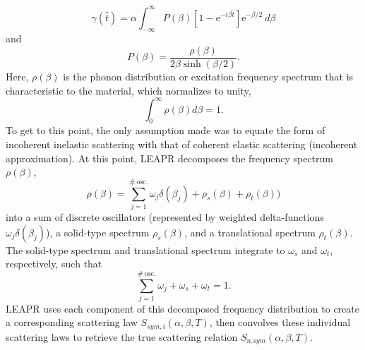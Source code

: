 \documentclass[../master.tex]{subfiles}
\begin{document}
			\begin{equation} 
				\gamma(\hat{t})=\alpha\int_{-\infty}^{\infty}P(\beta)\left[1-\mathrm{e}^{-i\beta\hat{t}}\right]\mathrm{e}^{-\beta/2}~d\beta\label{eq:gamma}
			\end{equation}
			and
			\begin{equation}
				P(\beta)=\frac{\rho(\beta)}{2\beta\sinh(\beta/2)}.
			\end{equation}
			Here, $\rho(\beta)$ is the phonon distribution or excitation frequency spectrum that is characteristic to the material, which normalizes to unity,
			\begin{equation}
				\int_{0}^{\infty}\rho(\beta)d\beta=1.
			\end{equation}
			To get to this point, the only assumption made was to equate the form of incoherent inelastic scattering with that of coherent elastic scattering (incoherent approximation). At this point, LEAPR decomposes the frequency spectrum $\rho(\beta)$,
			\begin{equation}
				\rho(\beta)=\sum_{j=1}^{\#~\mbox{osc.}}\omega_j\delta(\beta_j)+\rho_s(\beta)+\rho_t(\beta))
			\end{equation}
			into a sum of discrete oscillators (represented by weighted delta-functions $\omega_j\delta(\beta_j)$), a solid-type spectrum $\rho_s(\beta)$, and a translational spectrum $\rho_t(\beta)$. The solid-type spectrum and translational spectrum integrate to $\omega_s$ and $\omega_t$, respectively, such that 
			\begin{equation}
                          \sum_{j=1}^{\#~\mbox{osc.}}\omega_j + \omega_s + \omega_t = 1.\label{eq:weightsSumTo1}
			\end{equation}
			LEAPR uses each component of this decomposed frequency distribution to create a corresponding scattering law $S_{sym,i}(\alpha,\beta,T)$, then convolves these individual scattering laws to retrieve the true scattering relation $S_{n.sym}(\alpha,\beta,T)$.
\end{document}

